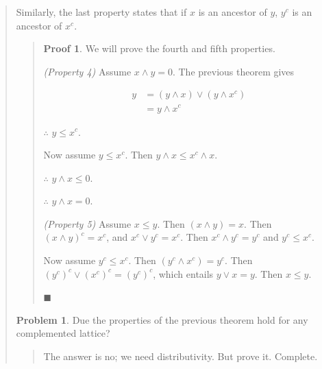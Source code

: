 \documentclass[a4paper, 12pt]{article}
\theoremstyle{definition}
\newtheorem{problem}{Problem}
\theoremstyle{definition}
\theoremstyle{definition}
\newtheorem{pro}{Proof}
\begin{document}
\begin{quote}
Similarly, the last property states that if $x$ is an ancestor of $y$,
$y^c$ is an ancestor of $x^c$.


\small
\begin{quote}

\begin{pro}
    We will prove the fourth and fifth properties. 

    \textit{(Property 4)} Assume $x \land  y = 0$. The previous 
    theorem gives

    \begin{align*}
        y &= (y \land  x) \lor  (y \land x^c)\\ 
          &= y \land x^c
    \end{align*}

    $\therefore $ $y \leq x^c$.

    Now assume $y \leq x^c$. Then $y \land  x \leq x^c \land x$. 

    $\therefore $ $y \land  x \leq 0$. 

    $\therefore $ $y \land  x = 0$.

    \textit{(Property 5)} Assume $x \leq y$. Then $(x \land  y) = x$. Then $(x
    \land  y)^c = x^c$, and $x^c \lor y^c = x^c$. Then $x^c \land  y^c = y^c$
    and $y^c \leq x^c$.

    Now assume $y^c \leq x^c$. Then $(y^c \land x^c) = y^c$. Then $(y^c)^c \lor
    (x^c)^c = (y^c)^c$, which entails $y \lor  x = y$. Then $x \leq y$.

    $\blacksquare$


\end{pro}

\end{quote}
\normalsize

\begin{problem}
    Due the properties of the previous theorem hold for any complemented 
    lattice?
\end{problem}


\small
\begin{quote}

The answer is no; we need distributivity. But prove it. Complete.

\end{quote}
\normalsize



\end{quote}
\end{document}
